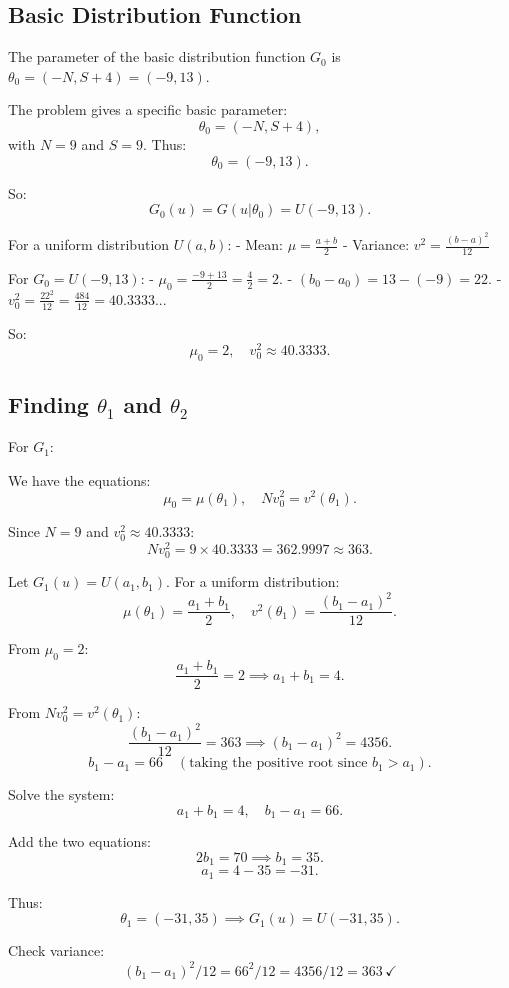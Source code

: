 \documentclass{article}
\begin{document}
\subsection{Basic Distribution Function}

The parameter of the basic distribution function $G_0$ is $\theta_0 = (-N, S + 4) = (-9, 13)$.

The problem gives a specific basic parameter:
\[
\theta_0 = (-N, S + 4),
\]
with \(N = 9\) and \(S = 9\). Thus:
\[
\theta_0 = (-9, 13).
\]

So:
\[
G_0(u) = G(u|\theta_0) = U(-9, 13).
\]

For a uniform distribution \(U(a,b)\):
- Mean: \(\mu = \frac{a+b}{2}\)
- Variance: \(v^2 = \frac{(b-a)^2}{12}\)

For \(G_0 = U(-9, 13)\):
- \(\mu_0 = \frac{-9 + 13}{2} = \frac{4}{2} = 2.\)
- \((b_0 - a_0) = 13 - (-9) = 22.\)
- \(v_0^2 = \frac{22^2}{12} = \frac{484}{12} = 40.3333...\)

So:
\[
\mu_0 = 2, \quad v_0^2 \approx 40.3333.
\]

\subsection{Finding \(\theta_1\) and \(\theta_2\)}

For \(G_1 \):

We have the equations:
\[
\mu_0 = \mu(\theta_1), \quad N v_0^2 = v^2(\theta_1).
\]

Since \(N = 9\) and \(v_0^2 \approx 40.3333\):
\[
N v_0^2 = 9 \times 40.3333 = 362.9997 \approx 363.
\]

Let \(G_1(u) = U(a_1,b_1)\). For a uniform distribution:
\[
\mu(\theta_1) = \frac{a_1 + b_1}{2}, \quad v^2(\theta_1) = \frac{(b_1 - a_1)^2}{12}.
\]

From \(\mu_0 = 2\):
\[
\frac{a_1 + b_1}{2} = 2 \implies a_1 + b_1 = 4.
\]

From \(N v_0^2 = v^2(\theta_1)\):
\[
\frac{(b_1 - a_1)^2}{12} = 363 \implies (b_1 - a_1)^2 = 4356.
\]
\[
b_1 - a_1 = 66 \quad (\text{taking the positive root since } b_1 > a_1).
\]

Solve the system:
\[
a_1 + b_1 = 4, \quad b_1 - a_1 = 66.
\]

Add the two equations:
\[
2b_1 = 70 \implies b_1 = 35.
\]
\[
a_1 = 4 - 35 = -31.
\]

Thus:
\[
\theta_1 = (-31, 35) \implies G_1(u) = U(-31,35).
\]

Check variance:
\[
(b_1 - a_1)^2/12 = 66^2/12 = 4356/12 = 363 \, \checkmark
\]
\end{document}
